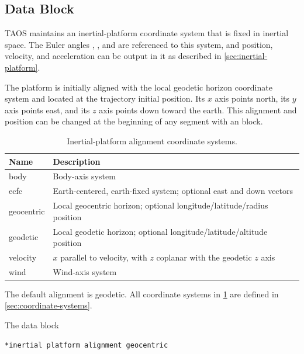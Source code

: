 \subsection{ Data Block}\label{sec:block-inertial}

TAOS maintains an inertial-platform coordinate system that is fixed in inertial
space. The Euler angles , , and
 are referenced to this system, and position, velocity, and
acceleration can be output in it as described in \cref{sec:inertial-platform}.

The platform is initially aligned with the local geodetic horizon coordinate system
and located at the trajectory initial position. Its $x$ axis points north, its $y$ axis
points east, and its $z$ axis points down toward the earth. This alignment and
position can be changed at the beginning of any segment with an
 block.

\begin{table}[htbp]
  \centering
  \caption{Inertial-platform alignment coordinate systems.}
  \label{tab:inertial-platform-alignments}
  \begin{tabularx}{0.82\linewidth}{@{}>{\ttfamily}lX@{}}
    \toprule
    \normalfont Name & Description \\
    \midrule
    body       & Body-axis system \\
    ecfc       & Earth-centered, earth-fixed system; optional east and down vectors \\
    geocentric & Local geocentric horizon; optional longitude/latitude/radius position \\
    geodetic   & Local geodetic horizon; optional longitude/latitude/altitude position \\
    velocity   & $x$ parallel to velocity, with $z$ coplanar with the geodetic $z$ axis \\
    wind       & Wind-axis system \\
    \bottomrule
  \end{tabularx}
\end{table}

The default alignment is geodetic. All coordinate systems in
\cref{tab:inertial-platform-alignments} are defined in \cref{sec:coordinate-systems}.


The data block

\begin{lstlisting}[style=taosmanual]
*inertial platform alignment geocentric
\end{lstlisting}

